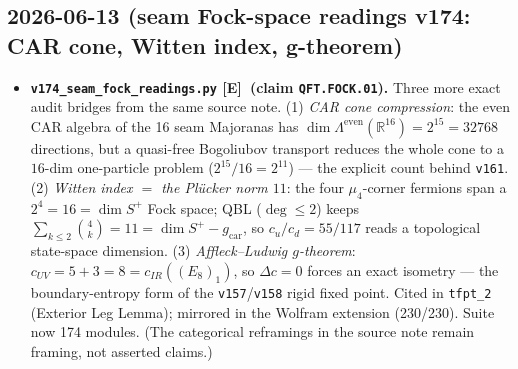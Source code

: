 \documentclass[11pt]{article}
\providecommand{\mE}{\textbf{[E]}}\providecommand{\mC}{\textbf{[C]}}
\providecommand{\vref}[1]{\texttt{#1}}
\providecommand{\gcar}{g_{\mathrm{car}}}\providecommand{\Nfam}{N_{\mathrm{fam}}}
\begin{document}
\subsection*{2026-06-13 (seam Fock-space readings v174: CAR cone, Witten index, g-theorem)}
\begin{itemize}
\item \textbf{\texttt{v174\_seam\_fock\_readings.py} \mE\ (claim \texttt{QFT.FOCK.01}).} Three more
  exact audit bridges from the same source note. (1) \emph{CAR cone compression}: the even CAR
  algebra of the 16 seam Majoranas has $\dim\Lambda^{\mathrm{even}}(\mathbb R^{16})=2^{15}=32768$
  directions, but a quasi-free Bogoliubov transport reduces the whole cone to a $16$-dim
  one-particle problem ($2^{15}/16=2^{11}$) --- the explicit count behind \vref{v161}. (2)
  \emph{Witten index $=$ the Pl\"ucker norm $11$}: the four $\mu_4$-corner fermions span a
  $2^4=16=\dim S^+$ Fock space; QBL ($\deg\le2$) keeps $\sum_{k\le2}\binom4k=11=\dim S^+-\gcar$, so
  $c_u/c_d=55/117$ reads a topological state-space dimension. (3) \emph{Affleck--Ludwig $g$-theorem}:
  $c_{UV}=5+3=8=c_{IR}((E_8)_1)$, so $\Delta c=0$ forces an exact isometry --- the boundary-entropy
  form of the \vref{v157}/\vref{v158} rigid fixed point. Cited in \texttt{tfpt\_2} (Exterior Leg
  Lemma); mirrored in the Wolfram extension (230/230). Suite now 174 modules. (The categorical
  reframings in the source note remain framing, not asserted claims.)
\end{itemize}
\end{document}

